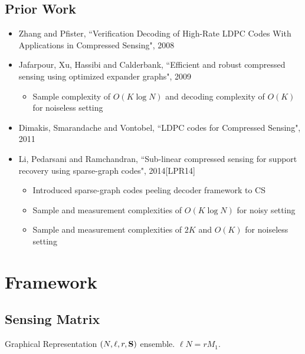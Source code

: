 \documentclass[10pt]{beamer}
\begin{document}
\subsection{Prior Work}
\begin{frame}
\begin{itemize}
\item Zhang and Pfister, ``Verification Decoding of High-Rate LDPC Codes With Applications in Compressed Sensing", 2008
\item  Jafarpour, Xu, Hassibi and Calderbank, ``Efficient and robust compressed sensing using optimized expander graphs", 2009
\begin{itemize}
\item Sample complexity of $O(K\log N)$ and decoding complexity of $O(K)$ for noiseless setting
\end{itemize}
\item Dimakis, Smarandache and Vontobel, ``LDPC codes for Compressed Sensing", 2011

\vspace{3ex}
\item Li, Pedarsani and Ramchandran, ``Sub-linear compressed sensing for support recovery using sparse-graph codes", 2014[LPR14]
\begin{itemize}
\item Introduced sparse-graph codes peeling decoder framework to CS
\item Sample and measurement complexities of $O(K\log N)$ for noisy setting
\item Sample and measurement complexities of $2K$ and $O(K)$ for noiseless setting
\end{itemize}
\end{itemize}
\end{frame}

\section{Framework}
\subsection{Sensing Matrix}
\begin{frame}{Graphical Representation}
$(N,\ell,r,\mathbf{S})$ ensemble. $\ell N=rM_1$. 
\begin{figure}
\scalebox{1.3}{}
\end{figure}
\end{frame}
\end{document}
